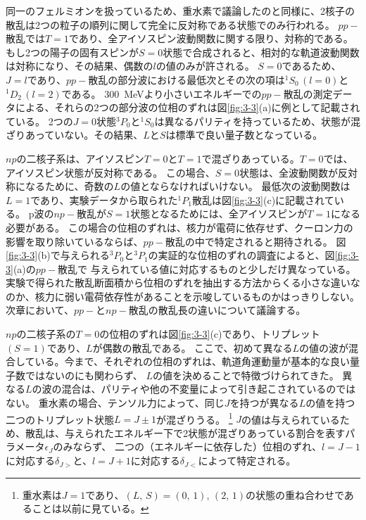 \documentclass[a4paper,11pt,uplatex]{jsarticle}
\begin{document}
同一のフェルミオンを扱っているため、重水素で議論したのと同様に、2核子の散乱は2つの粒子の順列に関して完全に反対称である状態でのみ行われる。
$pp-$散乱では$T=1$であり、全アイソスピン波動関数に関する限り、対称的である。
もし2つの陽子の固有スピンが$S=0$状態で合成されると、相対的な軌道波動関数は対称になり、その結果、偶数の$l$の値のみが許される。
$S=0$であるため、$J=l$であり、$pp-$散乱の部分波における最低次とその次の項は$^{1}S_0\,(l=0)$と$^{1}D_2\,(l=2)$である。
\SI{300}{MeV}より小さいエネルギーでの$pp-$散乱の測定データによる、それらの2つの部分波の位相のずれは図\ref{fig:3-3}(a)に例として記載されている。
2つの$J=0$状態$^{3}P_0$と$^{1}S_0$は異なるパリティを持っているため、状態が混ざりあっていない。その結果、$L$と$S$は標準で良い量子数となっている。

$np$の二核子系は、アイソスピン$T=0$と$T=1$で混ざりあっている。$T=0$では、アイソスピン状態が反対称である。
この場合、$S=0$状態は、全波動関数が反対称になるために、奇数の$L$の値とならなければいけない。
最低次の波動関数は$L=1$であり、実験データから取られた$^{1}P_1$散乱は図\ref{fig:3-3}(c)に記載されている。
p波の$np-$散乱が$S=1$状態となるためには、全アイソスピンが$T=1$になる必要がある。
この場合の位相のずれは、核力が電荷に依存せず、クーロン力の影響を取り除いているならば、$pp-$散乱の中で特定されると期待される。
図\ref{fig:3-3}(b)で与えられる$^{3}P_0$と$^{3}P_1$の実証的な位相のずれの調査によると、図\ref{fig:3-3}(a)の$pp-$散乱で
与えられている値に対応するものと少しだけ異なっている。
実験で得られた散乱断面積から位相のずれを抽出する方法からくる小さな違いなのか、核力に弱い電荷依存性があることを示唆しているものかはっきりしない。
次章において、$pp-$と$np-$散乱の散乱長の違いについて議論する。

$np$の二核子系の$T=0$の位相のずれは図\ref{fig:3-3}(c)であり、トリプレット$(S=1)$であり、$L$が偶数の散乱である。
ここで、初めて異なる$L$の値の波が混合している。今まで、それぞれの位相のずれは、軌道角運動量が基本的な良い量子数ではないのにも関わらず、
$L$の値を決めることで特徴づけられてきた。
異なる$L$の波の混合は、パリティや他の不変量によって引き起こされているのではない。
重水素の場合、テンソル力によって、同じ$J$を持つが異なる$L$の値を持つ二つのトリプレット状態$L=J\pm 1$が混ざりうる。
\footnote{重水素は$J=1$であり、$(L,\,S)=(0,\,1),\,(2,\,1)$の状態の重ね合わせであることは以前に見ている。}
$J$の値は与えられているため、散乱は、与えられたエネルギー下で2状態が混ざりあっている割合を表すパラメータ$\epsilon_J$のみならず、
二つの（エネルギーに依存した）位相のずれ、$l=J-1$に対応する$\delta_{J>}$と、$l=J+1$に対応する$\delta_{J<}$によって特定される。
\end{document}
